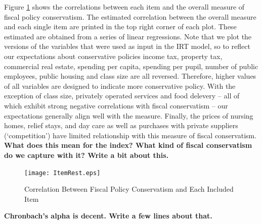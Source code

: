 \documentclass[a4paper,12pt]{article}
\begin{document}
Figure \ref{fig:ItemRest} shows the correlations between each item and the overall measure of fiscal policy conservatism. The estimated correlation between the overall measure and each single item are printed in the top right corner of each plot. These estimated are obtained from a series of linear regressions. Note that we plot the versions of the variables that were used as input in the IRT model, so to reflect our expectations about conservative policies income tax, property tax, commercial real estate, spending per capita, spending per pupil, number of public employees, public housing and class size are all reversed. Therefore, higher values of all variables are designed to indicate more conservative policy. With the exception of class size, privately operated services and food delevery -- all of which exhibit strong negative correlations with fiscal conservatism -- our expectations generally align well with the measure. Finally, the prices of nursing homes, relief stays, and day care as well as purchases with private suppliers (`competition') have limited relationship with this measure of fiscal conservatism. \textbf{What does this mean for the index? What kind of fiscal conservatism do we capture with it? Write a bit about this.}

\begin{figure}[htbp]
	\centering 
	
	\texttt{[image: ItemRest.eps]}
	\caption{Correlation Between Fiscal Policy Conservatism and Each Included Item}
	\label{fig:ItemRest}
	
\end{figure}


\textbf{Chronbach's alpha is decent. Write a few lines about that.}
\end{document}
